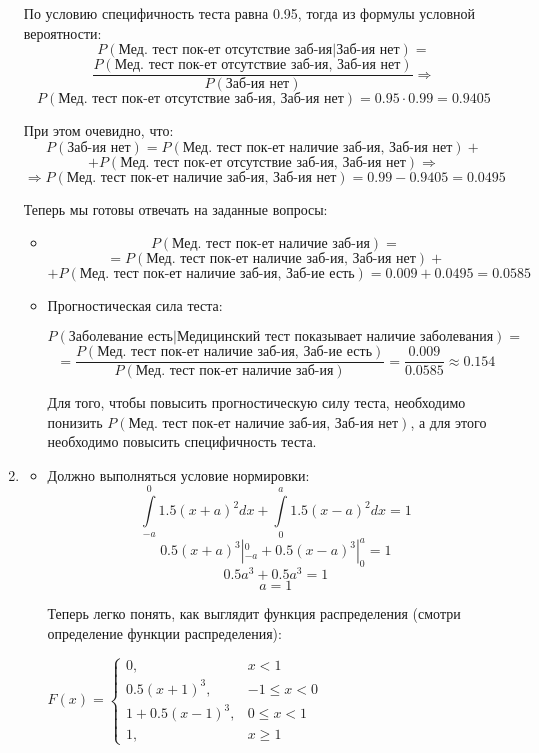 \documentclass[12pt, a4paper]{article}\usepackage[]{graphicx}\usepackage[]{color}
\begin{document}
\begin{enumerate}
По условию специфичность теста равна 0.95, тогда из формулы условной вероятности:
\[P(\text{Мед. тест пок-ет отсутствие заб-ия} | \text{Заб-ия нет}) = \]
\[\dfrac{P(\text{Мед. тест пок-ет отсутствие заб-ия, Заб-ия нет})}{P(\text{Заб-ия нет})} \Rightarrow\]
\[P(\text{Мед. тест пок-ет отсутствие заб-ия, Заб-ия нет}) =0.95 \cdot 0.99 = 0.9405\]

При этом очевидно, что:
\[P(\text{Заб-ия нет}) = P(\text{Мед. тест пок-ет наличие заб-ия, Заб-ия нет}) + \]
\[+ P(\text{Мед. тест пок-ет отсутствие заб-ия, Заб-ия нет}) \Rightarrow\]
\[\Rightarrow P(\text{Мед. тест пок-ет наличие заб-ия, Заб-ия нет}) = 0.99 - 0.9405 = 0.0495\]

Теперь мы готовы отвечать на заданные вопросы:

\begin{itemize}
\item
\[P(\text{Мед. тест пок-ет наличие заб-ия}) = \]
\[= P(\text{Мед. тест пок-ет наличие заб-ия, Заб-ия нет}) + \]
\[+ P(\text{Мед. тест пок-ет наличие заб-ия, Заб-ие есть}) = 0.009+0.0495 = 0.0585 \]

\item Прогностическая сила теста:

\[P(\text{Заболевание есть} | \text{Медицинский тест показывает наличие заболевания}) = \]
\[= \dfrac{P(\text{Мед. тест пок-ет наличие заб-ия, Заб-ие есть})}{P(\text{Мед. тест пок-ет наличие заб-ия}) } = \dfrac{0.009}{0.0585} \approx 0.154\]

Для того, чтобы повысить прогностическую силу теста, необходимо понизить $P(\text{Мед. тест пок-ет наличие заб-ия, Заб-ия нет}) $, а для этого необходимо повысить специфичность теста.

\end{itemize}

\item
\begin{itemize}
\item
Должно выполняться условие нормировки:
\[\int \limits_{-a}^0 1.5(x+a)^2 dx + \int \limits_0^a 1.5(x- a)^2  dx = 1   \]
\[0.5(x+a)^3 |_{-a}^0 + 0.5(x- a)^3 |_0^a  = 1   \]
\[0.5a^3 + 0.5a^3 = 1\]
\[a = 1\]

Теперь легко понять, как выглядит функция распределения (смотри определение функции распределения):

$F(x) = \begin{cases}
0, & x < 1 \\
0.5 (x+1)^3, & -1 \leqslant x <0 \\
1 + 0.5 (x-1)^3, & 0 \leqslant x < 1 \\
1, & x \geqslant 1
\end{cases}$


\end{itemize}
\end{enumerate}
\end{document}

